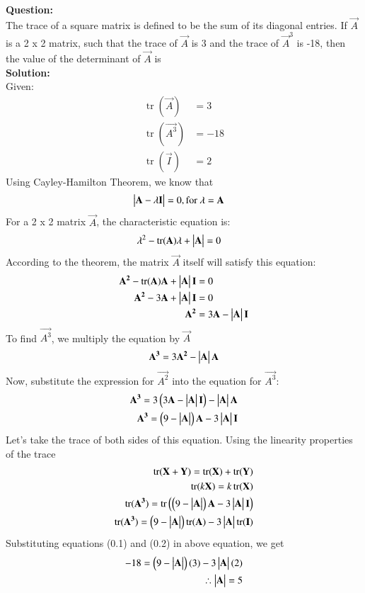 \documentclass[journal]{IEEEtran}
\begin{document}
\textbf{Question:}\\
The trace of a square matrix is defined to be the sum of its diagonal entries. If $\vec{A}$ is a 2 x 2 matrix, such that the trace of $\vec{A}$ is 3 and the trace of $\vec{A}^{3}$ is -18, then the value of the determinant of $\vec{A}$ is\\
\textbf{Solution:}\\
Given:
\begin{align}
    \operatorname{tr}(\vec{A})&=3\\
    \operatorname{tr}(\vec{A^3})&=-18\\
    \operatorname{tr}(\vec{I})&=2
\end{align}
Using Cayley-Hamilton Theorem, we know that
\begin{align}
    \begin{vmatrix}\mathbf{A}-\lambda\mathbf{I}\end{vmatrix}&=0,
    \text{for $\lambda=\mathbf{A}$}		
\end{align}
For a 2 x 2 matrix $\vec{A}$, the characteristic equation is:
\begin{align}
    \lambda^{2}-\operatorname{tr}(\mathbf{A})\lambda+\begin{vmatrix}\mathbf{A}\end{vmatrix}&=0
\end{align}
According to the theorem, the matrix $\vec{A}$ itself will satisfy this equation:
\begin{align}
    \mathbf{A^2}-\operatorname{tr}(\mathbf{A})\mathbf{A}+\begin{vmatrix}\mathbf{A}\end{vmatrix}\mathbf{I}&=0\\
        \mathbf{A^2}-3\mathbf{A}+\begin{vmatrix}\mathbf{A}\end{vmatrix}\mathbf{I}&=0\\
        \mathbf{A^2}&=3\mathbf{A}-\begin{vmatrix}\mathbf{A}\end{vmatrix}\mathbf{I}
\end{align}
To find $\vec{A^3}$, we multiply the equation by $\vec{A}$
\begin{align}
    \mathbf{A^3}=3\mathbf{A^2}-\begin{vmatrix}\mathbf{A}\end{vmatrix}\mathbf{A}
\end{align}
Now, substitute the expression for $\vec{A^2}$ into the equation for $\vec{A^3}$:
\begin{align}
\mathbf{A^3}=3\left(3\mathbf{A}-\begin{vmatrix}\mathbf{A}\end{vmatrix}\mathbf{I}\right)-\begin{vmatrix}\mathbf{A}\end{vmatrix}\mathbf{A}\\
\mathbf{A^3}=\left(9-\begin{vmatrix}\mathbf{A}\end{vmatrix}\right)\mathbf{A}-3\begin{vmatrix}\mathbf{A}\end{vmatrix}\mathbf{I}
\end{align}
Let's take the trace of both sides of this equation. Using the linearity properties of the trace 
\begin{align}
    \operatorname{tr}(\mathbf{X}+\mathbf{Y})=\operatorname{tr}(\mathbf{X})+\operatorname{tr}(\mathbf{Y})\\
    \operatorname{tr}(k\mathbf{X})=k\operatorname{tr}(\mathbf{X})\\
    \operatorname{tr}(\mathbf{A^3})=\operatorname{tr}\left(\left(9-\begin{vmatrix}\mathbf{A}\end{vmatrix}\right)\mathbf{A}-3\begin{vmatrix}\mathbf{A}\end{vmatrix}\mathbf{I}\right)\\
    \operatorname{tr}(\mathbf{A^3})=\left(9-\begin{vmatrix}\mathbf{A}\end{vmatrix}\right)\operatorname{tr}(\mathbf{A})-3\begin{vmatrix}\mathbf{A}\end{vmatrix}\operatorname{tr}(\mathbf{I})
\end{align}
Substituting equations (0.1) and (0.2) in above equation, we get
\begin{align}
    -18=\left(9-\begin{vmatrix}\mathbf{A}\end{vmatrix}\right)(3)-3\begin{vmatrix}\mathbf{A}\end{vmatrix}(2)\\
    \therefore \begin{vmatrix}\mathbf{A}\end{vmatrix}=5
\end{align}
\end{document}
